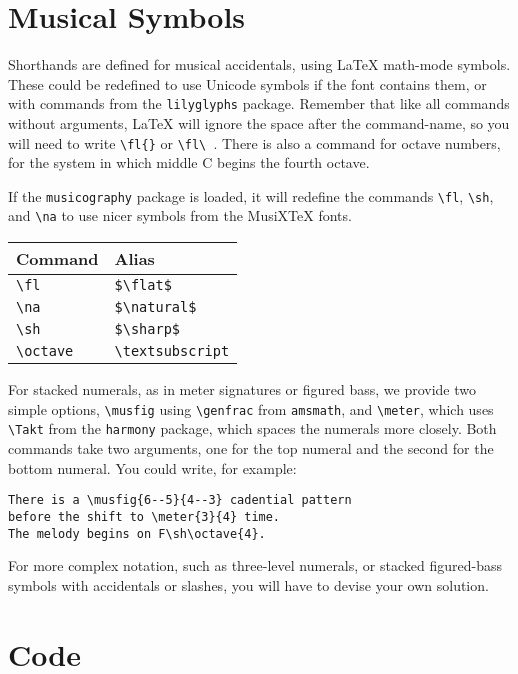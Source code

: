 \documentclass{article}
\begin{document}
\section{Musical Symbols}

Shorthands are defined for musical accidentals, using \LaTeX{} math-mode symbols. 
These could be redefined to use Unicode symbols if the font contains them, or with commands from the \texttt{lilyglyphs} package.
Remember that like all commands without arguments, \LaTeX{} will ignore the space after the command-name, so you will need to write \verb|\fl{}| or \verb|\fl\ |.
There is also a command for octave numbers, for the system in which middle C begins the fourth octave.

If the \texttt{musicography} package is loaded, it will redefine the commands
\verb|\fl|, \verb|\sh|, and \verb|\na| to use nicer symbols from the MusiX\TeX{}
fonts.

\begin{center}
\begin{tabular}{ll}
\toprule
Command & Alias\\
\midrule
\verb|\fl| & \verb|$\flat$|\\
\verb|\na| & \verb|$\natural$|\\
\verb|\sh| & \verb|$\sharp$|\\
\verb|\octave| & \verb|\textsubscript|\\
\bottomrule
\end{tabular}
\end{center}

For stacked numerals, as in meter signatures or figured bass, we provide two simple options, \verb|\musfig| using \verb|\genfrac| from \texttt{amsmath}, and \verb|\meter|, which uses \verb|\Takt| from the \texttt{harmony} package, which spaces the numerals more closely.
Both commands take two arguments, one for the top numeral and the second for the bottom numeral.
You could write, for example: 

\begin{verbatim}
There is a \musfig{6--5}{4--3} cadential pattern
before the shift to \meter{3}{4} time.
The melody begins on F\sh\octave{4}.
\end{verbatim}

\begin{center}
\end{center}

For more complex notation, such as three-level numerals, or stacked figured-bass symbols with accidentals or slashes, you will have to devise your own solution.

\section{Code}

\end{document}
